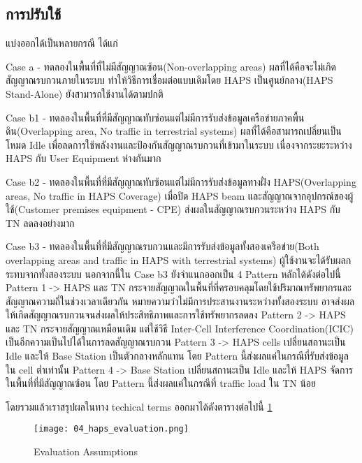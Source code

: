 \subsection{การปรับใช้}
แบ่งออกได้เป็นหลายกรณี ได้แก่

\begin{description}
    \item Case a - ทดลองในพื้นที่ที่ไม่มีสัญญาณซ้อน(Non-overlapping areas) ผลที่ได้คือจะไม่เกิดสัญญาณรบกวนภายในระบบ
            ทำให้วิธีการเชื่อมต่อแบบเดิมโดย HAPS เป็นศูนย์กลาง(HAPS Stand-Alone) ยังสามารถใช้งานได้ตามปกติ
    \item Case b1 - ทดลองในพื้นที่ที่มีสัญญาณทับซ่อนแต่ไม่มีการรับส่งข้อมูลเครือข่ายภาคพื้นดิน(Overlapping area, No traffic in terrestrial systems)
            ผลที่ได้คือสามารถเปลี่ยนเป็นโหมด Idle เพื่อลดการใช้พลังงานและป้องกันสัญญาณรบกวนที่เข้ามาในระบบ เนื่องจากระยะระหว่าง HAPS กับ User Equipment ห่างกันมาก
    \item Case b2 - ทดลองในพื้นที่ที่มีสัญญาณทับซ้อนแต่ไม่มีการรับส่งข้อมูลทางฝั่ง HAPS(Overlapping areas, No traffic in HAPS Coverage)
            เมื่อปิด HAPS beam และสัญญาณจากอุปกรณ์ของผู้ใช้(Customer premises equipment - CPE) ส่งผลในสัญญาณรบกวนระหว่าง HAPS กับ TN ลดลงอย่างมาก
    \item Case b3 - ทดลองในพื้นที่ที่มีสัญญาณรบกวนและมีการรับส่งข้อมูลทั้งสองเครือข่าย(Both overlapping areas and traffic in HAPS with terrestrial systems)
            ผู้ใช้งานจะได้รับผลกระทบจากทั้งสองระบบ นอกจากนี้ใน Case b3 ยังจำแนกออกเป็น 4 Pattern หลักได้ดังต่อไปนี้ 
            Pattern 1 -> HAPS และ TN กระจายสัญญาณในพื้นที่ที่ครอบคลุมโดยใช้ปริมาณทรัพยากรและสัญญาณความถี่ในช่วงเวลาเดียวกัน หมายความว่าไม่มีการประสานงานระหว่างทั้งสองระบบ 
                อาจส่งผลให้เกิดสัญญาณรบกวนจนส่งผลให้ประสิทธิภาพและการใช้ทรัพยากรลดลง
            Pattern 2 -> HAPS และ TN กระจายสัญญาณเหมือนเดิม แต่ใช้วิธี Inter-Cell Interference Coordination(ICIC) เป็นอีกความเป็นไปได้ในการลดสัญญาณรบกวน
            Pattern 3 -> HAPS cells เปลี่ยนสถานะเป็น Idle และให้ Base Station เป็นตัวกลางหลักแทน โดย Pattern นี้ส่งผลแค่ในกรณีที่รับส่งข้อมูลใน cell ต่ำเท่านั้น
            Pattern 4 -> Base Station เปลี่ยนสถานะเป็น Idle และให้ HAPS จัดการในพื้นที่ที่มีสัญญาณซ้อน โดย Pattern นี้ส่งผลแค่ในกรณีที่ traffic load ใน TN น้อย
\end{description}

โดยรวมแล้วเราสรุปผลในทาง techical terms ออกมาได้ดังตารางต่อไปนี้ \ref{fig:04-haps-evaluation}

\begin{figure}[h]
\centering
\caption[]{Evaluation Assumptions}
\label{fig:04-haps-evaluation} 
\texttt{[image: 04\_haps\_evaluation.png]}
\end{figure}


